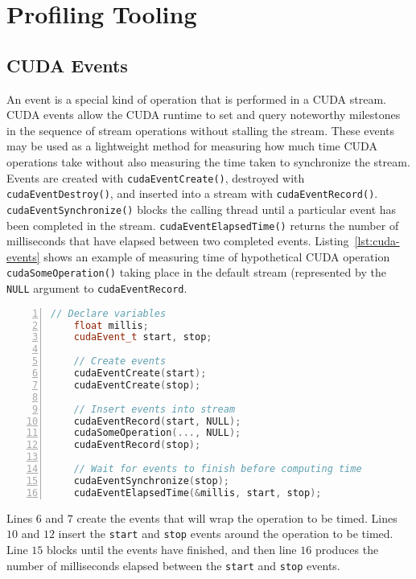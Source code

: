 \section{Profiling Tooling}
\label{sec:profiling}

\subsection{CUDA Events}

An event is a special kind of operation that is performed in a CUDA stream.
CUDA events allow the CUDA runtime to set and query noteworthy milestones in the sequence of stream operations without stalling the stream.
These events may be used as a lightweight method for measuring how much time CUDA operations take without also measuring the time taken to synchronize the stream.
Events are created with \texttt{cudaEventCreate()}, destroyed with \texttt{cudaEventDestroy()}, and inserted into a stream with \texttt{cudaEventRecord()}.
\texttt{cudaEventSynchronize()} blocks the calling thread until a particular event has been completed in the stream.
\texttt{cudaEventElapsedTime()} returns the number of milliseconds that have elapsed between two completed events.
Listing~\ref{lst:cuda-events} shows an example of measuring time of hypothetical CUDA operation \texttt{cudaSomeOperation()} taking place in the default stream (represented by the \texttt{NULL} argument to \texttt{cudaEventRecord}.

\begin{lstlisting}[language=C++, caption=Measuring time with CUDA events., label=lst:cuda-events, numbers=left]
	// Declare variables
	float millis;
	cudaEvent_t start, stop;

	// Create events
	cudaEventCreate(start);
	cudaEventCreate(stop);

	// Insert events into stream
	cudaEventRecord(start, NULL);
	cudaSomeOperation(..., NULL);
	cudaEventRecord(stop);

	// Wait for events to finish before computing time
	cudaEventSynchronize(stop);
	cudaEventElapsedTime(&millis, start, stop);
\end{lstlisting}

Lines $6$ and $7$ create the events that will wrap the operation to be timed.
Lines $10$ and $12$ insert the \texttt{start} and \texttt{stop} events around the operation to be timed.
Line $15$ blocks until the events have finished, and then line $16$ produces the number of milliseconds elapsed between the \texttt{start} and \texttt{stop} events.

